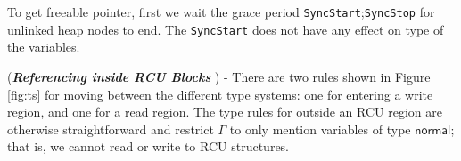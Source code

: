 To get \textsf{freeable} pointer, first we wait the grace period \texttt{SyncStart};\texttt{SyncStop} for unlinked heap nodes to end. The \texttt{SyncStart} does not have any effect on type of the variables.

(\textit{\textbf{Referencing inside \textsf{RCU} Blocks} } ) - There are two rules shown in Figure \ref{fig:ts} for moving between the different type systems: one for entering a write region, and one for a read region. The type rules for outside an RCU region are otherwise straightforward and restrict $\Gamma$ to only mention variables of type $\textsf{normal}$; that is, we cannot read or write to \textsf{RCU} structures.
